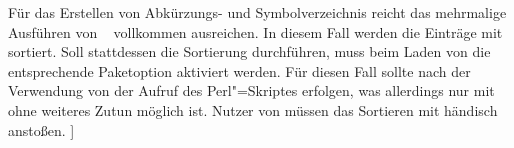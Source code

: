 \documentclass[%
  english,ngerman,%
  cdgeometry=no,DIV=12,automark,%
]{tudscrartcl}
\begin{document}
  Für das Erstellen von Abkürzungs- und Symbolverzeichnis reicht das 
  mehrmalige 
  Ausführen von ~ vollkommen ausreichen. In 
  diesem Fall werden die Einträge mit  sortiert. Soll 
  stattdessen  die Sortierung durchführen, muss beim Laden 
  von  die entsprechende Paketoption aktiviert werden. Für
  diesen Fall sollte nach der Verwendung von  der Aufruf des 
  Perl"=Skriptes  erfolgen, was 
  allerdings nur mit  ohne weiteres Zutun 
  möglich ist. Nutzer von  müssen das Sortieren 
  mit  händisch anstoßen.
]
\ListOfToDo
\end{document}
